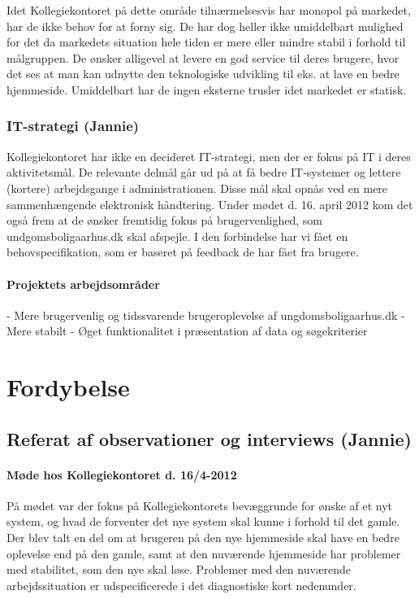 \documentclass[12pt, a4paper]{report}
\begin{document}
Idet Kollegiekontoret på dette område tilnærmelsesvis har monopol på markedet, har de ikke behov for at forny sig. De har dog heller ikke umiddelbart mulighed for det da markedets situation hele tiden er mere eller mindre stabil i forhold til målgruppen. De ønsker alligevel at levere en god service til deres brugere, hvor det ses at man kan udnytte den teknologiske udvikling til eks. at lave en bedre hjemmeside. Umiddelbart har de ingen eksterne trusler idet markedet er statisk.

  \subsubsection{IT-strategi (Jannie)}
Kollegiekontoret har ikke en decideret IT-strategi, men der er fokus på IT i deres aktivitetsmål. De relevante delmål går ud på at få bedre IT-systemer og lettere (kortere) arbejdsgange i administrationen. Disse mål skal opnås ved en mere sammenhængende elektronisk håndtering. Under mødet d. 16. april 2012 kom det også frem at de ønsker fremtidig fokus på brugervenlighed, som undgomsboligaarhus.dk skal afspejle. I den forbindelse har vi fået en behovspecifikation, som er baseret på feedback de har fået fra brugere.

 \paragraph{Projektets arbejdsområder}
- Mere brugervenlig og tidssvarende brugeroplevelse af ungdomsboligaarhus.dk \newline
- Mere stabilt \newline
- Øget funktionalitet i præsentation af data og søgekriterier \newline

\section{Fordybelse}
\subsection{Referat af observationer og interviews (Jannie)}
\paragraph{Møde hos Kollegiekontoret d. 16/4-2012}
På mødet var der fokus på Kollegiekontorets bevæggrunde for ønske af et nyt system, og hvad de forventer det nye system skal kunne i forhold til det gamle. Der blev talt en del om at brugeren på den nye hjemmeside skal have en bedre oplevelse end på den gamle, samt at den nuværende hjemmeside har problemer med stabilitet, som den nye skal løse. Problemer med den nuværende arbejdssituation er udspecificerede i det diagnostiske kort nedenunder.
\end{document}
